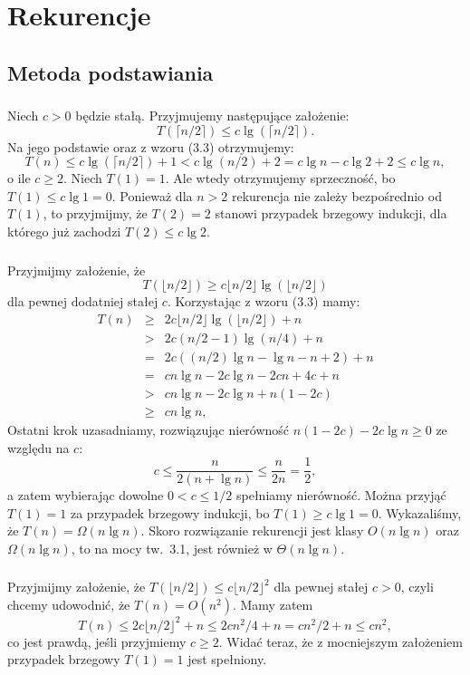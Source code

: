 \chapter{Rekurencje}

\section{Metoda podstawiania}

\subsection{} %
Niech $c>0$ będzie stałą. Przyjmujemy następujące założenie:
\[
	T(\lceil n/2\rceil) \le c\lg(\lceil n/2\rceil).
\]
Na jego podstawie oraz z wzoru (3.3) otrzymujemy:
\[
	T(n) \le c\lg(\lceil n/2\rceil)+1 < c\lg (n/2)+2 = c\lg n-c\lg 2+2 \le c\lg n,
\]
o ile $c\ge2$. Niech $T(1)=1$. Ale wtedy otrzymujemy sprzeczność, bo $T(1)\le c\lg1=0$. Ponieważ dla $n>2$ rekurencja nie zależy bezpośrednio od $T(1)$, to przyjmijmy, że $T(2)=2$ stanowi przypadek brzegowy indukcji, dla którego już zachodzi $T(2)\le c\lg2$.

\subsection{} %
Przyjmijmy założenie, że
\[
	T(\lfloor n/2\rfloor) \ge c\lfloor n/2\rfloor\lg(\lfloor n/2\rfloor)
\]
dla pewnej dodatniej stałej $c$. Korzystając z wzoru (3.3) mamy:
\begin{eqnarray*}
	T(n) &\ge& 2c\lfloor n/2\rfloor\lg(\lfloor n/2\rfloor)+n \\
	&>& 2c(n/2-1)\lg(n/4)+n \\
	&=& 2c((n/2)\lg n-\lg n-n+2)+n \\
	&=& cn\lg n-2c\lg n-2cn+4c+n \\
	&>& cn\lg n-2c\lg n+n(1-2c) \\
	&\ge& cn\lg n,
\end{eqnarray*}
Ostatni krok uzasadniamy, rozwiązując nierówność $n(1-2c)-2c\lg n\ge0$ ze względu na $c$:
\[
	c \le \frac{n}{2(n+\lg n)} \le \frac{n}{2n} = \frac{1}{2},
\]
a zatem wybierając dowolne $0<c\le1/2$ spełniamy nierówność. Można przyjąć $T(1)=1$ za przypadek brzegowy indukcji, bo $T(1)\ge c\lg1=0$. Wykazaliśmy, że $T(n)=\Omega(n\lg n)$. Skoro rozwiązanie rekurencji jest klasy $O(n\lg n)$ oraz $\Omega(n\lg n)$, to na mocy tw.~3.1, jest również w $\Theta(n\lg n)$.

\subsection{} %
Przyjmijmy założenie, że $T(\lfloor n/2\rfloor)\le c\lfloor n/2\rfloor^2$ dla pewnej stałej $c>0$, czyli chcemy udowodnić, że $T(n)=O(n^2)$. Mamy zatem
\[
	T(n) \le 2c\lfloor n/2\rfloor^2+n \le 2cn^2\!/4 + n = cn^2\!/2+n \le cn^2,
\]
co jest prawdą, jeśli przyjmiemy $c\ge2$. Widać teraz, że z mocniejszym założeniem przypadek brzegowy $T(1)=1$ jest spełniony.

